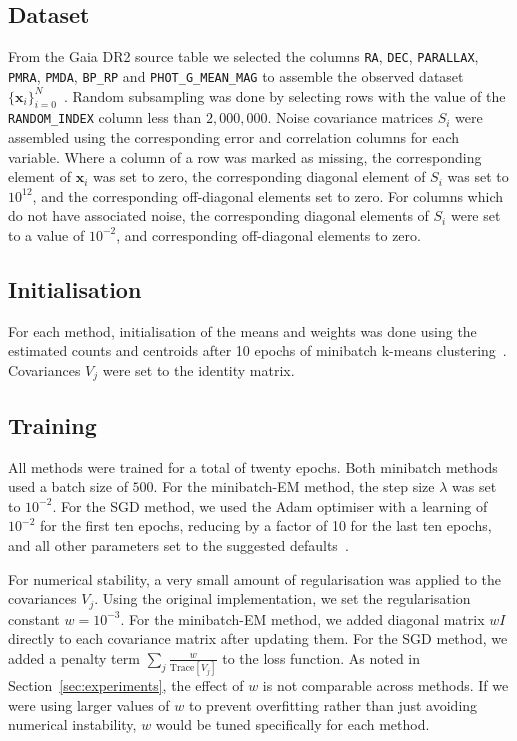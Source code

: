 \documentclass{article}
\newcommand{\bx}{\mathbf{x}}
\begin{document}
\subsection{Dataset}

From the Gaia DR2 source table we selected the columns \texttt{RA}, \texttt{DEC}, \texttt{PARALLAX}, \texttt{PMRA}, \texttt{PMDA}, \texttt{BP\_RP} and \texttt{PHOT\_G\_MEAN\_MAG} to assemble the observed dataset $\{\bx_i\}_{i=0}^N$~\cite{brownGaiaDataRelease2018}.
Random subsampling was done by selecting rows with the value of the \texttt{RANDOM\_INDEX} column less than $2,000,000$.
Noise covariance matrices $S_i$ were assembled using the corresponding error and correlation columns for each variable.
Where a column of a row was marked as missing, the corresponding element of $\bx_i$ was set to zero, the corresponding diagonal element of $S_i$ was set to $10^{12}$, and the corresponding off-diagonal elements set to zero.
For columns which do not have associated noise, the corresponding diagonal elements of $S_i$ were set to a value of $10^{-2}$, and corresponding off-diagonal elements to zero.

\subsection{Initialisation}
For each method, initialisation of the means and weights was done using the estimated counts and centroids after 10 epochs of minibatch k-means clustering~\cite{sculleyWebscaleKmeansClustering2010}.
Covariances $V_j$ were set to the identity matrix.

\subsection{Training}

All methods were trained for a total of twenty epochs.
Both minibatch methods used a batch size of $500$.
For the minibatch-EM method, the step size $\lambda$ was set to $10^{-2}$.
For the SGD method, we used the Adam optimiser with a learning of $10^{-2}$ for the first ten epochs, reducing by a factor of 10 for the last ten epochs, and all other parameters set to the suggested defaults~\cite{kingmaAdamMethodStochastic2014}.

For numerical stability, a very small amount of regularisation was applied to the covariances $V_j$.
Using the original implementation, we set the regularisation constant $w = 10^{-3}$.
For the minibatch-EM method, we added diagonal matrix $wI$ directly to each covariance matrix after updating them.
For the SGD method, we added a penalty term $\sum_j \frac{w}{\mathrm{Trace}[V_j]}$ to the loss function.
As noted in Section~\ref{sec:experiments}, the effect of $w$ is not comparable across methods.
If we were using larger values of $w$ to prevent overfitting rather than just avoiding numerical instability, $w$ would be tuned specifically for each method.
\end{document}

